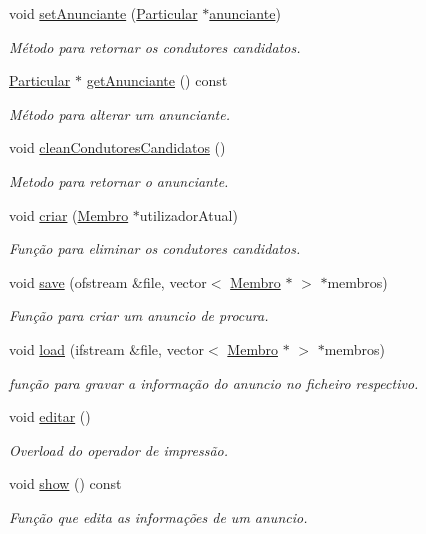 \begin{DoxyCompactItemize}
void \hyperlink{class_anuncio_procura_a303be648c388693e6b92e6bf467c06ff}{set\+Anunciante} (\hyperlink{class_particular}{Particular} $\ast$\hyperlink{class_anuncio_a58250bfc8ab82d4308839b1e26213a0f}{anunciante})
\begin{DoxyCompactList}\small\item\em Método para retornar os condutores candidatos. \end{DoxyCompactList}\item 
\hyperlink{class_particular}{Particular} $\ast$ \hyperlink{class_anuncio_procura_aadc1d2f42fd3a9629498065b931e9134}{get\+Anunciante} () const 
\begin{DoxyCompactList}\small\item\em Método para alterar um anunciante. \end{DoxyCompactList}\item 
void \hyperlink{class_anuncio_procura_a7258f159f42bb53a3d7fe96f34e04280}{clean\+Condutores\+Candidatos} ()
\begin{DoxyCompactList}\small\item\em Metodo para retornar o anunciante. \end{DoxyCompactList}\item 
void \hyperlink{class_anuncio_procura_a73abd85989eee52b20c7ffca120ae5de}{criar} (\hyperlink{class_membro}{Membro} $\ast$utilizador\+Atual)
\begin{DoxyCompactList}\small\item\em Função para eliminar os condutores candidatos. \end{DoxyCompactList}\item 
void \hyperlink{class_anuncio_procura_a3e41646018004c3efb37c9dab3482c96}{save} (ofstream \&file, vector$<$ \hyperlink{class_membro}{Membro} $\ast$ $>$ $\ast$membros)
\begin{DoxyCompactList}\small\item\em Função para criar um anuncio de procura. \end{DoxyCompactList}\item 
void \hyperlink{class_anuncio_procura_a9983a05725bcdcee8aee8f778c79920b}{load} (ifstream \&file, vector$<$ \hyperlink{class_membro}{Membro} $\ast$ $>$ $\ast$membros)
\begin{DoxyCompactList}\small\item\em função para gravar a informação do anuncio no ficheiro respectivo. \end{DoxyCompactList}\item 
void \hyperlink{class_anuncio_procura_ae7ef0a393b385df69d7ee4d22a10e4ec}{editar} ()
\begin{DoxyCompactList}\small\item\em Overload do operador de impressão. \end{DoxyCompactList}\item 
void \hyperlink{class_anuncio_procura_a7a9ac26488642a35643f5322acf40788}{show} () const 
\begin{DoxyCompactList}\small\item\em Função que edita as informações de um anuncio. \end{DoxyCompactList}\end{DoxyCompactItemize}
